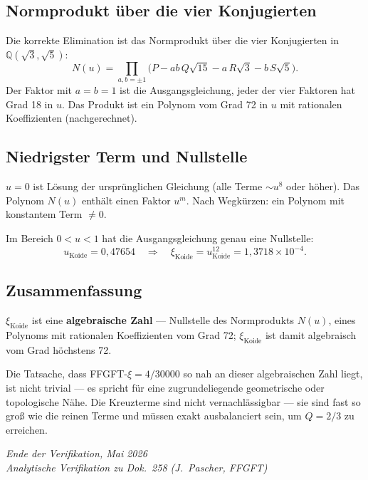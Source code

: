 \subsection{Normprodukt über die vier Konjugierten}

Die korrekte Elimination ist das Normprodukt über die vier Konjugierten
in $\mathbb{Q}(\sqrt3,\sqrt5)$:
\[
  N(u)=\prod_{a,b=\pm1}\bigl(P-ab\,Q\sqrt{15}-a\,R\sqrt{3}-b\,S\sqrt{5}\bigr).
\]
Der Faktor mit $a=b=1$ ist die Ausgangsgleichung, jeder der vier Faktoren
hat Grad 18 in $u$. Das Produkt ist ein Polynom vom Grad 72 in $u$ mit
rationalen Koeffizienten (nachgerechnet).

\subsection{Niedrigster Term und Nullstelle}

$u=0$ ist Lösung der ursprünglichen Gleichung (alle Terme $\sim u^8$ oder höher).
Das Polynom $N(u)$ enthält einen Faktor $u^m$. Nach Wegkürzen:
ein Polynom mit konstantem Term $\neq0$.

Im Bereich $0<u<1$ hat die Ausgangsgleichung genau eine Nullstelle:
\[
  u_{\text{Koide}}=0{,}47654
  \quad\Rightarrow\quad
  \xi_{\text{Koide}}=u_{\text{Koide}}^{12}=1{,}3718\times10^{-4}.
\]

\subsection{Zusammenfassung}

$\xi_{\text{Koide}}$ ist eine \textbf{algebraische Zahl} — Nullstelle des
Normprodukts $N(u)$, eines Polynoms mit rationalen Koeffizienten vom Grad 72;
$\xi_{\text{Koide}}$ ist damit algebraisch vom Grad höchstens 72.

Die Tatsache, dass FFGFT-$\xi=4/30000$ so nah an dieser algebraischen Zahl liegt,
ist nicht trivial — es spricht für eine zugrundeliegende geometrische
oder topologische Nähe.
Die Kreuzterme sind nicht vernachlässigbar — sie sind fast so groß wie die
reinen Terme und müssen exakt ausbalanciert sein, um $Q=2/3$ zu erreichen.

\bigskip
\begin{flushright}
\textit{Ende der Verifikation, Mai 2026}\\
\textit{Analytische Verifikation zu Dok.~258 (J.~Pascher, FFGFT)}
\end{flushright}
